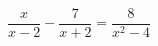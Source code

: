 \begin{ex}
	\begin{condition}
		\( \dfrac{x}{x-2}-\dfrac{7}{x+2}=\dfrac{8}{x^2-4} \)
	\end{condition}
\end{ex}